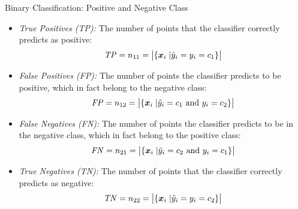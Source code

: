 \begin{frame}{Binary Classif\/{i}cation: Positive and Negative Class}

\begin{itemize}
  \item \textit{True Positives (TP):}
    The number of points that
    the classif\/{i}er correctly predicts as positive:
  \begin{align*}
    \mathit{TP} = n_{11} = \bigl|\{{\boldsymbol x}_i \;| \hat{y}_i = y_i = c_1\}\bigr|
  \end{align*}

\item \textit{False Positives (FP):}
The number of points the classif\/{i}er
  predicts to be positive, which in fact belong to the negative
  class:
  \begin{align*}
    \mathit{FP} = n_{12} = \bigl|\{{\boldsymbol x}_i\;| \hat{y}_i = c_1 \text{ and } y_i = c_2
    \}\bigr|
  \end{align*}

  \item \textit{False Negatives (FN):}
The number of points the classif\/{i}er
    predicts to be in the negative class, which in fact belong to the
    positive class:
  \begin{align*}
    \mathit{FN} = n_{21} = \bigl|\{{\boldsymbol x}_i\;| \hat{y}_i = c_2 \text{ and } y_i = c_1
    \}\bigr|
  \end{align*}

     \item \textit{True Negatives (TN):}
The number of points that
     the classif\/{i}er correctly predicts as negative:
  \begin{align*}
    \mathit{TN} = n_{22} = \bigl|\{{\boldsymbol x}_i \;| \hat{y}_i = y_i = c_2\}\bigr|
  \end{align*}
\end{itemize}
\end{frame}


